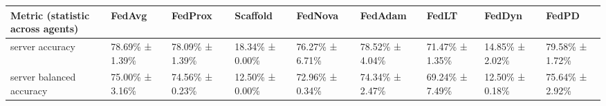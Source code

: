 \begin{tabular}{lllllllll}
\hline
 Metric (statistic across agents)   & FedAvg         & FedProx        & Scaffold       & FedNova        & FedAdam        & FedLT          & FedDyn         & FedPD          \\
\hline
 server accuracy                    & 78.69\% ± 1.39\% & 78.09\% ± 1.39\% & 18.34\% ± 0.00\% & 76.27\% ± 6.71\% & 78.52\% ± 4.04\% & 71.47\% ± 1.35\% & 14.85\% ± 2.02\% & 79.58\% ± 1.72\% \\
 server balanced accuracy           & 75.00\% ± 3.16\% & 74.56\% ± 0.23\% & 12.50\% ± 0.00\% & 72.96\% ± 0.34\% & 74.34\% ± 2.47\% & 69.24\% ± 7.49\% & 12.50\% ± 0.18\% & 75.64\% ± 2.92\% \\
\hline
\end{tabular}